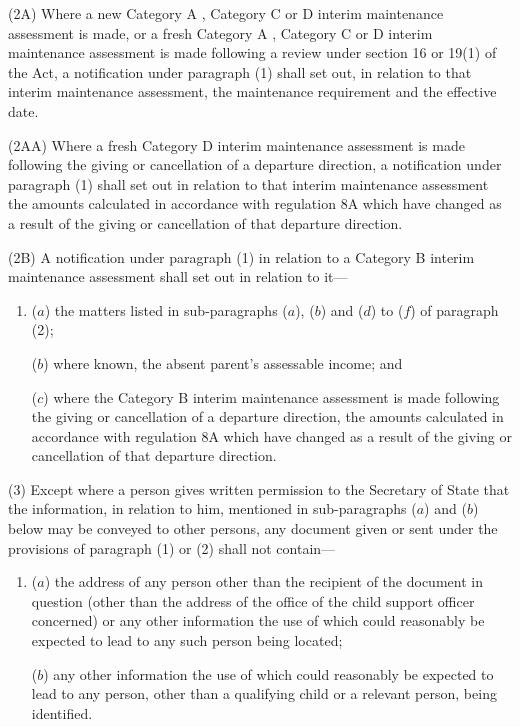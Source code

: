 \documentclass[a4paper]{article}
\begin{document}
(2A) Where a new Category A%
, Category C or D  %
interim maintenance assessment is made, or a fresh Category A%
, Category C or D  %
interim maintenance assessment is made following a review under section 16 or 19(1) of the Act, a notification under paragraph (1) shall set out, in relation to that interim maintenance assessment, the maintenance requirement and the effective date.

(2AA) Where a fresh Category D interim maintenance assessment is made following the giving or cancellation of a departure direction, a notification under paragraph (1) shall set out in relation to that interim maintenance assessment the amounts calculated in accordance with regulation 8A which have changed as a result of the giving or cancellation of that departure direction.

(2B) A notification under paragraph (1) in relation to a Category B interim maintenance assessment shall set out in relation to it—
\begin{enumerate}\item[]
%

($a$) the matters listed in sub-paragraphs ($a$), ($b$) and ($d$) to ($f$) of paragraph (2);

($b$) where known, the absent parent’s assessable income; and

($c$) where the Category B interim maintenance assessment is made following the giving or cancellation of a departure direction, the amounts calculated in accordance with regulation 8A which have changed as a result of the giving or cancellation of that departure direction.
\end{enumerate}

(3) Except where a person gives written permission to the Secretary of State that the information, in relation to him, mentioned in sub-paragraphs ($a$) and ($b$) below may be conveyed to other persons, any document given or sent under the provisions of paragraph (1) or (2) shall not contain—
\begin{enumerate}\item[]
($a$) the address of any person other than the recipient of the document in question (other than the address of the office of the child support officer concerned) or any other information the use of which could reasonably be expected to lead to any such person being located;

($b$) any other information the use of which could reasonably be expected to lead to any person, other than a qualifying child or a relevant person, being identified.
\end{enumerate}
\end{document}
